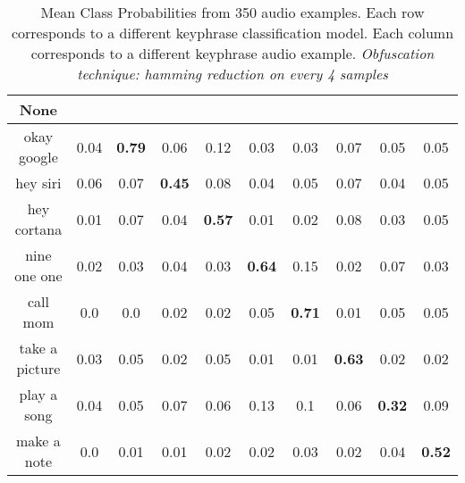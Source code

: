 \begin{table}[!th]
\begin{tabular}{cccccccccc}%
\hline%
None&\rotate{random talk}{70}&\rotate{okay google}{70}&\rotate{hey siri}{70}&\rotate{hey cortana}{70}&\rotate{nine one one}{70}&\rotate{call mom}{70}&\rotate{take a picture}{70}&\rotate{play a song}{70}&\rotate{make a note}{70}\\%
\hline%
okay google&0.04&\textbf{0.79}&0.06&0.12&0.03&0.03&0.07&0.05&0.05\\%
hey siri&0.06&0.07&\textbf{0.45}&0.08&0.04&0.05&0.07&0.04&0.05\\%
hey cortana&0.01&0.07&0.04&\textbf{0.57}&0.01&0.02&0.08&0.03&0.05\\%
nine one one&0.02&0.03&0.04&0.03&\textbf{0.64}&0.15&0.02&0.07&0.03\\%
call mom&0.0&0.0&0.02&0.02&0.05&\textbf{0.71}&0.01&0.05&0.05\\%
take a picture&0.03&0.05&0.02&0.05&0.01&0.01&\textbf{0.63}&0.02&0.02\\%
play a song&0.04&0.05&0.07&0.06&0.13&0.1&0.06&\textbf{0.32}&0.09\\%
make a note&0.0&0.01&0.01&0.02&0.02&0.03&0.02&0.04&\textbf{0.52}\\%
\hline%
\end{tabular}
\caption{Mean Class Probabilities from 350 audio examples. Each row corresponds to a different keyphrase classification model. Each column corresponds to a different keyphrase audio example. \emph{Obfuscation technique: hamming reduction on every 4 samples}}
\label{tab:probs_raw_audio_hamming_4}
\end{table}





